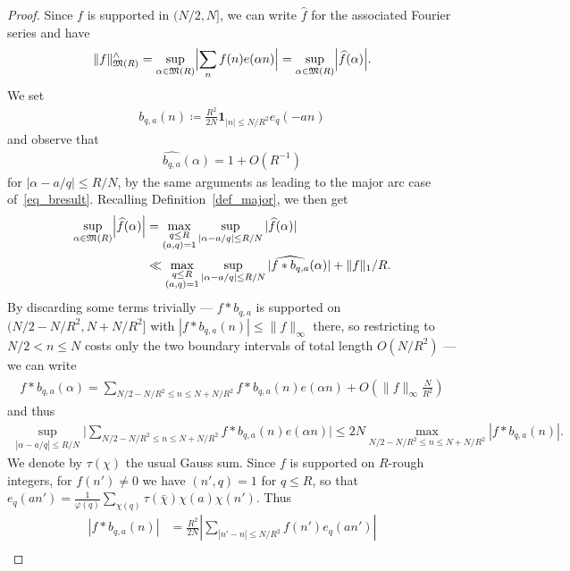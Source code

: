 \documentclass[12pt]{amsart}
\theoremstyle{definition}
\theoremstyle{remark}
\numberwithin{equation}{section}
\newcommand{\1}{\mathbf{1}}
\begin{document}
\begin{proof}
Since $f$ is supported in $(N/2,N]$, we can write $\widehat{f}$ for the associated Fourier series and have
\begin{align*}
    \|f \|_{\mathfrak{M}(R)}^{\wedge}=\sup_{\alpha \in \mathfrak{M}(R)} \Bigl| \sum_{n}f(n) e(\alpha n) \Bigr|=\sup_{\alpha \in \mathfrak{M}(R)} \Bigl| \widehat{f}(\alpha)\Bigr|.
\end{align*}
We set 
\begin{align*}
    b_{q,a}(n)\coloneqq\frac{R^2}{2N} \1_{|n|\leq N/R^2}e_q(-an)
\end{align*}
and observe that 
\begin{align*}
    \widehat{b_{q,a}}(\alpha)=1+O(R^{-1})
\end{align*}
for $|\alpha-a/q|\leq R/N$, by the same arguments as leading to the major arc case of~\eqref{eq_bresult}. Recalling Definition~\ref{def_major}, we then get
\begin{align*}
   \sup_{\alpha \in \mathfrak{M}(R)} \Bigl| \widehat{f}(\alpha)\Bigr|&=\max_{\substack{q\leq R\\ (a,q)=1}} \sup_{|\alpha-a/q|\leq R/N} |\widehat{f}(\alpha)|\\
    &\ll \max_{\substack{q\leq R\\ (a,q)=1}} \sup_{|\alpha-a/q|\leq R/N} |\widehat{f*b_{q,a}}(\alpha)|+\|f\|_1/R.
\end{align*}
By discarding some terms trivially --- $f*b_{q,a}$ is supported on $(N/2-N/R^2,N+N/R^2]$ with $|f*b_{q,a}(n)|\leq\|f\|_\infty$ there, so restricting to $N/2<n\leq N$ costs only the two boundary intervals of total length $O(N/R^2)$ --- we can write
\begin{align*}
  \widehat{f*b_{q,a}}(\alpha)=\sum_{N/2-N/R^2\leq n \leq N+N/R^2} f*b_{q,a}(n)e(\alpha n)+O\left(\|f\|_\infty \frac{N}{R^2}\right)
\end{align*}
and thus
\begin{align*}
    \sup_{|\alpha-a/q|\leq R/N} \Bigg| \sum_{N/2-N/R^2\leq n \leq N+N/R^2} f*b_{q,a}(n)e(\alpha n)\Bigg|\leq 2N \max_{N/2-N/R^2\leq n \leq N+N/R^2} | f*b_{q,a}(n)|.
\end{align*}
We denote by $\tau(\chi)$ the usual Gauss sum. Since $f$ is supported on $R$-rough integers, for $f(n')\neq 0$ we have $(n',q)=1$ for $q \le R$, so that $e_q(an') = \frac{1}{\varphi(q)} \sum_{\chi(q)} \tau(\bar\chi) \chi(a) \chi(n')$. Thus
\begin{align*}
    |f*b_{q,a}(n)|&=\frac{R^2}{2N}\left|\sum_{|n'-n|\leq N/R^2}f(n')e_q(an') \right| \\

\end{align*}
\end{proof}
\end{document}
